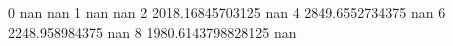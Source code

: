 0 nan nan
1 nan nan
2 2018.16845703125 nan
4 2849.6552734375 nan
6 2248.958984375 nan
8 1980.6143798828125 nan
